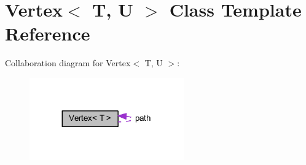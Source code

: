 \hypertarget{class_vertex}{}\section{Vertex$<$ T, U $>$ Class Template Reference}
\label{class_vertex}


Collaboration diagram for Vertex$<$ T, U $>$\+:
\nopagebreak
\begin{figure}[H]
\begin{center}
\leavevmode
\includegraphics[width=188pt]{class_vertex__coll__graph}
\end{center}
\end{figure}
